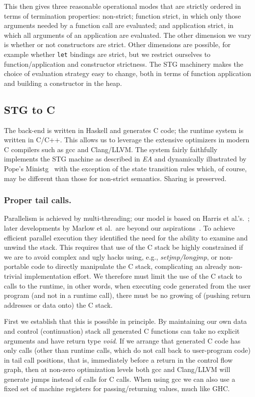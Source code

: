 \documentclass{llncs}
\begin{document}
This then gives three reasonable operational modes that are strictly ordered
in terms of termination properties: non-strict; function strict, in which only
those arguments needed by a function call are evaluated; and application
strict, in which all arguments of an application are evaluated.  The other
dimension we vary is whether or not constructors are strict.  Other dimensions
are possible, for example whether \texttt{let} bindings are strict, but we
restrict ourselves to function/application and constructor strictness.  The
STG machinery makes the choice of evaluation strategy easy to change, both in
terms of function application and building a constructor in the heap.

\subsection{STG to C}
The back-end is written in Haskell and generates C code;
the runtime system is written in C/C++. This allows us to leverage the extensive
optimizers in modern C compilers such as gcc and Clang/LLVM. The system fairly 
faithfully implements the STG machine as described in \emph{EA} and dynamically
illustrated by Pope's Ministg~\cite{ministg} with the exception of the state
transition rules which, of course, may be different than those for non-strict
semantics.  Sharing is preserved.

\subsubsection{Proper tail calls.}
Parallelism is achieved by multi-threading; our model is based on Harris et
al.'s.~\cite{Harris:2005}; later developments by Marlow et al.\ are beyond our
aspirations~\cite{Marlow:2009,Marlow:2011}.  To achieve efficient parallel 
execution they identified the need for the ability to examine and unwind the 
stack.  This requires that use of the C stack be highly constrained if we are 
to avoid complex and ugly hacks using, e.g., \emph{setjmp/longjmp}, or
non-portable code to directly manipulate the C stack, complicating an
already non-trivial implementation effort.  We therefore must limit the
use of the C stack to calls to the runtime, in other words, when executing
code generated from the user program (and not in a runtime call), there
must be no growing of (pushing return addresses or data onto) the C stack.

First we establish that this is possible in principle.  By maintaining our own
data and control (continuation) stack all generated C functions can take no
explicit arguments and have return type \emph{void}. If we arrange that
generated C code has only calls (other than runtime calls, which do not call
back to user-program code) in tail call positions, that is, immediately before
a return in the control flow graph, then at non-zero optimization levels both
gcc and Clang/LLVM will generate jumps instead of calls for C calls.  When
using gcc we can also use a fixed set of machine registers for
passing/returning values, much like GHC.
\end{document}

